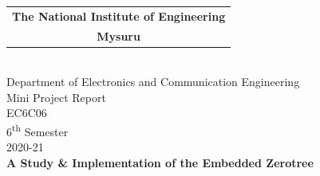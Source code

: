 \documentclass[a4paper,12pt]{report}
\begin{document}
\begin{titlepage}
    \begin{center}
        \noindent
        \hfill
        \begin{tabular}{@{}c@{}}
            \textbf{\Large The National Institute of Engineering} \\
            \textbf{\Large{Mysuru}}
        \end{tabular}
        \hfill
         \\
        \vspace{5cm}
        {\huge Department of Electronics and Communication Engineering} \\
        \vspace{2cm}
        \large{Mini Project Report} \\
        \large{EC6C06} \\
        \large{6\textsuperscript{th} Semester} \\
        \large{2020-21} \\
        \vspace{1cm}
        \textbf{\huge A Study \& Implementation of the Embedded Zerotree
}
\end{center}
\end{titlepage}
\end{document}
